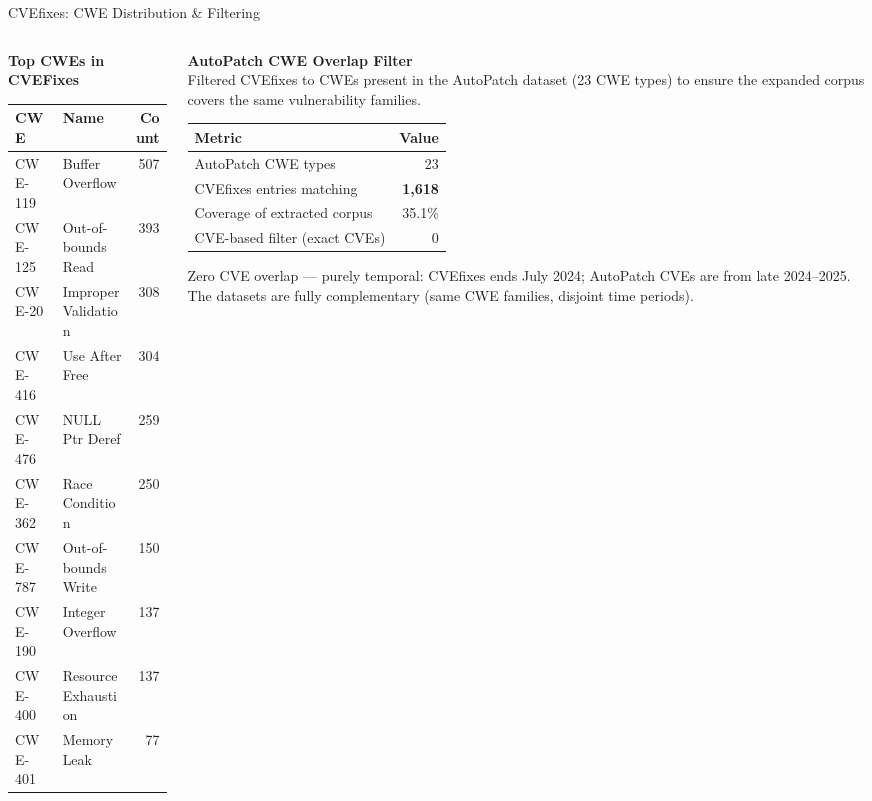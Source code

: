 \documentclass[aspectratio=169,10pt]{beamer}
\begin{document}
\begin{frame}{CVEfixes: CWE Distribution \& Filtering}
\begin{columns}[T]
\begin{column}{0.48\textwidth}

  \textbf{Top CWEs in CVEFixes}\\[4pt]
  {\scriptsize
  \renewcommand{\arraystretch}{1.2}
  \begin{tabular}{llr}
    \toprule
    \textbf{CWE} & \textbf{Name} & \textbf{Count} \\
    \midrule
    CWE-119 & Buffer Overflow & 507 \\
    CWE-125 & Out-of-bounds Read & 393 \\
    CWE-20  & Improper Validation & 308 \\
    CWE-416 & Use After Free & 304 \\
    CWE-476 & NULL Ptr Deref & 259 \\
    CWE-362 & Race Condition & 250 \\
    CWE-787 & Out-of-bounds Write & 150 \\
    CWE-190 & Integer Overflow & 137 \\
    CWE-400 & Resource Exhaustion & 137 \\
    CWE-401 & Memory Leak & 77 \\
    \bottomrule
  \end{tabular}}

\end{column}
\begin{column}{0.50\textwidth}

  \textbf{AutoPatch CWE Overlap Filter}\\[4pt]
  {\small Filtered CVEfixes to CWEs present in the AutoPatch dataset
  (23 CWE types) to ensure the expanded corpus covers the same
  vulnerability families.}

  \vspace{0.5em}
  {\scriptsize
  \renewcommand{\arraystretch}{1.2}
  \begin{tabular}{lr}
    \toprule
    \textbf{Metric} & \textbf{Value} \\
    \midrule
    AutoPatch CWE types & 23 \\
    CVEfixes entries matching & \textbf{1,618} \\
    Coverage of extracted corpus & 35.1\% \\
    \midrule
    CVE-based filter (exact CVEs) & 0 \\
    \bottomrule
  \end{tabular}}

  \vspace{0.5em}
  {\small\textcolor{c1}{} Zero CVE overlap — purely temporal:
  CVEfixes ends July 2024; AutoPatch CVEs are from late 2024--2025.
  The datasets are fully complementary (same CWE families, disjoint time periods).}

\end{column}
\end{columns}
\end{frame}
\end{document}
